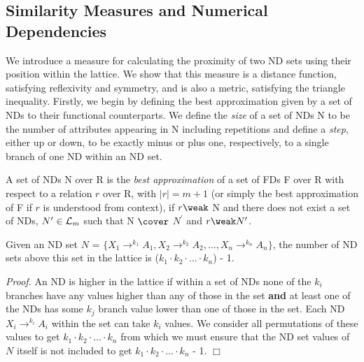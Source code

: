 \subsection{Similarity Measures and Numerical Dependencies}

We introduce a measure for calculating the proximity of two ND sets using
their position within the lattice.  We show that this measure is a distance
function, satisfying reflexivity and symmetry, and is also a metric, 
satisfying the triangle inequality. Firstly, we begin by defining the best
approximation given by a set of NDs to their functional counterparts.
We define the {\em size} of a set of NDs N to be the number of attributes 
appearing in N including repetitions and define a {\em step}, either up
or down, to be exactly minus or plus one, respectively, to a single branch of
one ND within an ND set. 

\begin{definition}\label{def:best}
\begin{rm}
A set of NDs N over R is the {\em best approximation} of 
a set of FDs F over R with respect to a relation $r$ over R,
with $\mid r \mid = m+1$ (or simply the best approximation of F
if $r$ is understood from context), if $r \weak$ N 
and there does not exist a set of NDs, $N^\prime \in {\cal L}_m$
such that N $\cover$ $N^\prime$ and $r \weak N^\prime$.
\end{rm}
\end{definition}



\begin{proposition}
\begin{rm}
Given an ND set $N$ = \linebreak[4]   $\{ X_1 \to^{k_1} A_1, X_2 \to^{k_2} A_2,
 \ldots, X_n \to^{k_n} A_n \}$, the number of ND sets above this set in the
lattice is ($k_1 \cdot k_2 \cdot \ldots \cdot k_n$) - 1.
\end{rm}
\end{proposition}

{\em Proof.} An ND is higher in the lattice if within a 
set of NDs none of the $k_i$ branches have any values higher than
any of those in the set {\bf and} at least one of the NDs has some 
$k_j$ branch value
lower than one of those in the set. Each ND $X_i \to^{k_i} A_i$ within
the set can take $k_i$ values. We consider all permutations of these
values to get $k_1 \cdot k_2 \cdot \ldots \cdot k_n$ from which we 
must ensure that the ND set values of $N$ itself is not included to get
$k_1 \cdot k_2 \cdot \ldots \cdot k_n$ - 1. $\Box$

